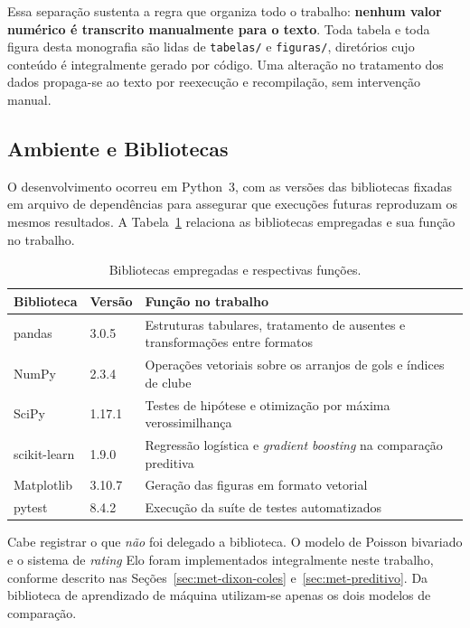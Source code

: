 Essa separação sustenta a regra que organiza todo o trabalho: \textbf{nenhum
valor numérico é transcrito manualmente para o texto}. Toda tabela e toda figura
desta monografia são lidas de \texttt{tabelas/} e \texttt{figuras/}, diretórios
cujo conteúdo é integralmente gerado por código. Uma alteração no tratamento dos
dados propaga-se ao texto por reexecução e recompilação, sem intervenção manual.

\subsection{Ambiente e Bibliotecas}\label{sec:ambiente}

O desenvolvimento ocorreu em Python~3, com as versões das bibliotecas fixadas em
arquivo de dependências para assegurar que execuções futuras reproduzam os
mesmos resultados. A Tabela~\ref{tab:bibliotecas} relaciona as bibliotecas
empregadas e sua função no trabalho.

\begin{table}[htb]
  \centering
  \caption{Bibliotecas empregadas e respectivas funções.}
  \label{tab:bibliotecas}
  \small
  \begin{tabular}{@{}llp{7.4cm}@{}}
    \toprule
    \textbf{Biblioteca} & \textbf{Versão} & \textbf{Função no trabalho} \\
    \midrule
    pandas       & 3.0.5  & Estruturas tabulares, tratamento de ausentes e
                            transformações entre formatos \\
    NumPy        & 2.3.4  & Operações vetoriais sobre os arranjos de gols e
                            índices de clube \\
    SciPy        & 1.17.1 & Testes de hipótese e otimização por máxima
                            verossimilhança~\cite{Virtanen2020} \\
    scikit-learn & 1.9.0  & Regressão logística e \textit{gradient boosting} na
                            comparação preditiva~\cite{Pedregosa2011} \\
    Matplotlib   & 3.10.7 & Geração das figuras em formato vetorial \\
    pytest       & 8.4.2  & Execução da suíte de testes automatizados \\
    \bottomrule
  \end{tabular}
\end{table}

Cabe registrar o que \emph{não} foi delegado a biblioteca. O modelo de Poisson
bivariado e o sistema de \textit{rating} Elo foram implementados integralmente
neste trabalho, conforme descrito nas Seções~\ref{sec:met-dixon-coles}
e~\ref{sec:met-preditivo}. Da biblioteca de aprendizado de máquina utilizam-se
apenas os dois modelos de comparação.

